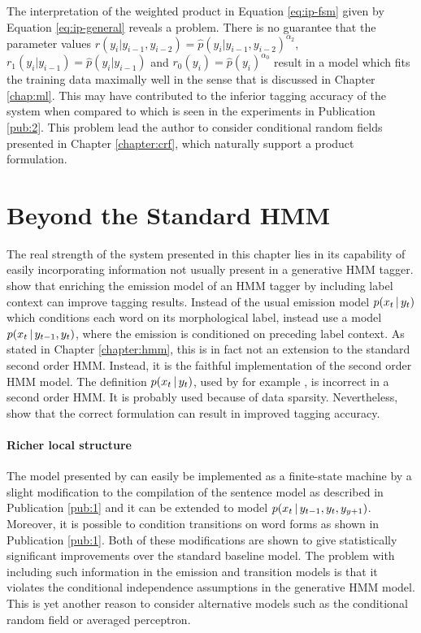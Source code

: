 The interpretation of the weighted product in Equation \ref{eq:ip-fsm}
given by Equation \ref{eq:ip-general} reveals a problem. There is no
guarantee that the parameter values $r(y_i|y_{i-1},y_{i-2}) =
\hat{p}(y_i|y_{i-1},y_{i-2})^{\alpha_2}$, $r_1(y_i|y_{i-1}) =
\hat{p}(y_i|y_{i-1})$ and $r_0(y_i) = \hat{p}(y_i)^{\alpha_0}$ result
in a model which fits the training data maximally well in the sense
that is discussed in Chapter \ref{chap:ml}. This may have contributed
to the inferior tagging accuracy of the system when compared to
\cite{Brants2000} which is seen in the experiments in Publication
\ref{pub:2}. This problem lead the
author to consider conditional random fields presented in Chapter
\ref{chapter:crf}, which naturally support a product formulation.

\section{Beyond the Standard HMM}\label{sec:enriched}

The real strength of the system presented in this chapter lies in its
capability of easily incorporating information not usually present in
a generative HMM tagger. \cite{Halacsy2007} show that enriching the
emission model of an HMM tagger by including label context can improve
tagging results. Instead of the usual emission model $p(x_t\mbox{$ \, | \, $} y_t)$
which conditions each word on its morphological label,
\cite{Halacsy2007} instead use a model $p(x_t\mbox{$ \, | \, $} y_{t-1},y_t)$,
where the emission is conditioned on preceding label context. As
stated in Chapter \ref{chapter:hmm}, this is in fact not an extension
to the standard second order HMM. Instead, it is the faithful
implementation of the second order HMM model. The definition
$p(x_t\mbox{$ \, | \, $} y_t)$, used by for example \cite{Brants2000}, is incorrect
in a second order HMM. It is probably used because of data
sparsity. Nevertheless, \cite{Halacsy2007} show that the correct
formulation can result in improved tagging accuracy.

\paragraph{Richer local structure} The model presented by
\cite{Halacsy2007} can easily be implemented as a finite-state machine
by a slight modification to the compilation of the sentence model as
described in Publication \ref{pub:1} and it can be extended to model
$p(x_t\mbox{$ \, | \, $} y_{t-1}, y_t, y_{y+1})$. Moreover, it is possible to
condition transitions on word forms as shown in Publication
\ref{pub:1}. Both of these modifications are shown to give
statistically significant improvements over the standard baseline
model. The problem with including such information in the emission and
transition models is that it violates the conditional independence
assumptions in the generative HMM model. This is yet another reason to
consider alternative models such as the conditional random field or
averaged perceptron.

